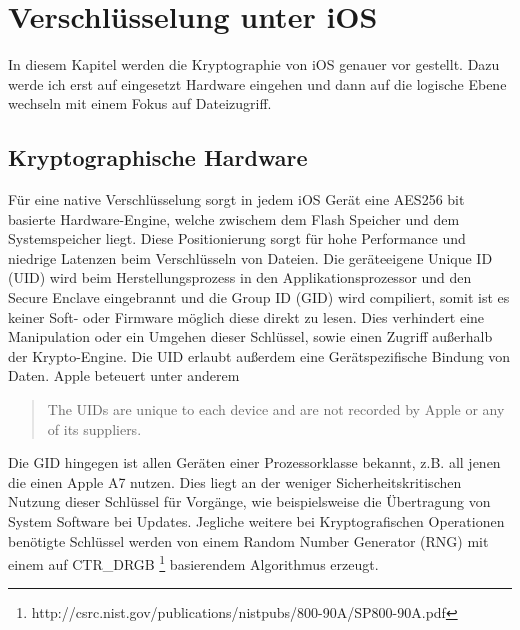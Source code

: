 \section{Verschlüsselung unter iOS}
	In diesem Kapitel werden die Kryptographie von iOS genauer vor gestellt.
	Dazu werde ich erst auf eingesetzt Hardware eingehen und dann auf die logische
	Ebene wechseln mit einem Fokus auf Dateizugriff.
	\subsection{Kryptographische Hardware}\label{sec:crypto-engine}
		Für eine native Verschlüsselung sorgt in jedem iOS Gerät eine AES256 bit
		basierte Hardware-Engine, welche zwischem dem Flash	Speicher und dem
		Systemspeicher liegt. Diese Positionierung sorgt für hohe Performance und
		niedrige Latenzen beim Verschlüsseln von Dateien. Die geräteeigene Unique ID
		(UID) wird beim Herstellungsprozess in den Applikationsprozessor und den Secure
		Enclave eingebrannt und die Group ID (GID) wird compiliert, somit ist es keiner
		Soft- oder Firmware möglich diese direkt zu lesen. Dies verhindert eine
		Manipulation oder ein Umgehen dieser Schlüssel, sowie einen Zugriff außerhalb
		der Krypto-Engine. Die UID erlaubt außerdem eine Gerätspezifische Bindung von
		Daten.
		Apple beteuert unter anderem
		\begin{quote}
			The UIDs are unique to each device and are not recorded by Apple or any of its
			suppliers.\cite[S.9]{iOSSecurityApr2015}
		\end{quote}
		Die GID hingegen ist allen Geräten einer Prozessorklasse bekannt, z.B. all
		jenen die einen Apple A7 nutzen. Dies liegt an der weniger
		Sicherheitskritischen Nutzung dieser Schlüssel für Vorgänge,
		wie beispielsweise die Übertragung von System Software bei Updates. Jegliche
		weitere bei Kryptografischen Operationen benötigte Schlüssel werden von einem
		Random Number Generator (RNG) mit einem auf	CTR\_DRGB
		\footnote{http://csrc.nist.gov/publications/nistpubs/800-90A/SP800-90A.pdf}
		basierendem Algorithmus erzeugt.
